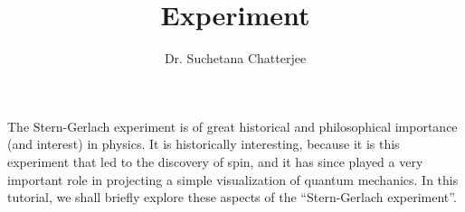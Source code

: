 \documentclass[12pt]{article}
\title{\sg Experiment}
\author{Dr. Suchetana Chatterjee}
\newcommand\sg{Stern-Gerlach }
\begin{document}
\maketitle

The \sg experiment is of great historical and philosophical importance (and interest) in physics. It is historically interesting, because it is this experiment that led to the discovery of spin, and it has since played a very important role in projecting a simple visualization of quantum mechanics. In this tutorial, we shall briefly explore these aspects of the ``\sg experiment''.

\begin{enumerate}[\bf 1.]




\end{enumerate}
\end{document}
